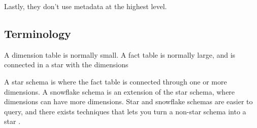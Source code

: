 Lastly, they don't use metadata at the highest level.

\subsection{Terminology}
\label{sub:Terminology}

A dimension table is normally small. A fact table is normally large, and is connected in a star with the dimensions

A star schema is where the fact table is connected through one or more dimensions. A snowflake schema is an extension of the star schema, where dimensions can have more dimensions. Star and snowflake schemas are easier to query, and there exists techniques that lets you turn a non-star schema into a star \cite{Lamb2012-kg}.

